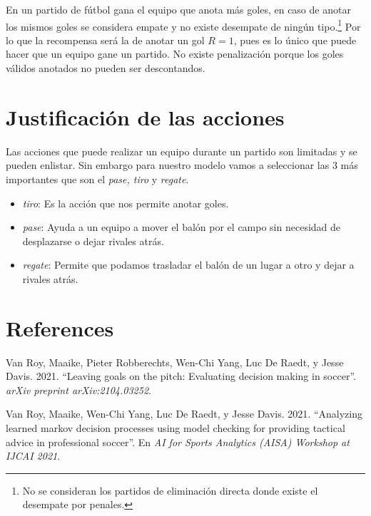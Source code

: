 \documentclass[
  us-letterpaper,
  DIV=11,
  numbers=noendperiod]{scrreprt}
\providecommand{\tightlist}{%
  \setlength{\itemsep}{0pt}\setlength{\parskip}{0pt}}\usepackage{longtable,booktabs,array}
\newlength{\cslhangindent}
\newenvironment{CSLReferences}[2] %
 {\begin{list}{}{%
  \setlength{\itemindent}{0pt}
  \setlength{\leftmargin}{0pt}
  \setlength{\parsep}{0pt}
  \ifodd #1
   \setlength{\leftmargin}{\cslhangindent}
   \setlength{\itemindent}{-1\cslhangindent}
  \fi
  \setlength{\itemsep}{#2\baselineskip}}}
 {\end{list}}
\begin{document}
En un partido de fútbol gana el equipo que anota más goles, en caso de
anotar los mismos goles se considera empate y no existe desempate de
ningún tipo.\footnote{No se consideran los partidos de eliminación
  directa donde existe el desempate por penales.} Por lo que la
recompensa será la de anotar un gol \(R=1\), pues es lo único que puede
hacer que un equipo gane un partido. No existe penalización porque los
goles válidos anotados no pueden ser descontandos.


\chapter{Justificación de las
acciones}\label{justificaciuxf3n-de-las-acciones}

Las acciones que puede realizar un equipo durante un partido son
limitadas y se pueden enlistar. Sin embargo para nuestro modelo vamos a
seleccionar las 3 más importantes que son el \emph{pase, tiro} y
\emph{regate}.

\begin{itemize}
\tightlist
\item
  \emph{tiro}: Es la acción que nos permite anotar goles.
\item
  \emph{pase}: Ayuda a un equipo a mover el balón por el campo sin
  necesidad de desplazarse o dejar rivales atrás.
\item
  \emph{regate}: Permite que podamos trasladar el balón de un lugar a
  otro y dejar a rivales atrás.
\end{itemize}


\chapter*{References}\label{references}


\label{refs}
\begin{CSLReferences}{1}{0}
Van Roy, Maaike, Pieter Robberechts, Wen-Chi Yang, Luc De Raedt, y Jesse
Davis. 2021. {``Leaving goals on the pitch: Evaluating decision making
in soccer''}. \emph{arXiv preprint arXiv:2104.03252}.

Van Roy, Maaike, Wen-Chi Yang, Luc De Raedt, y Jesse Davis. 2021.
{``Analyzing learned markov decision processes using model checking for
providing tactical advice in professional soccer''}. En \emph{AI for
Sports Analytics (AISA) Workshop at IJCAI 2021}.

\end{CSLReferences}
\end{document}
